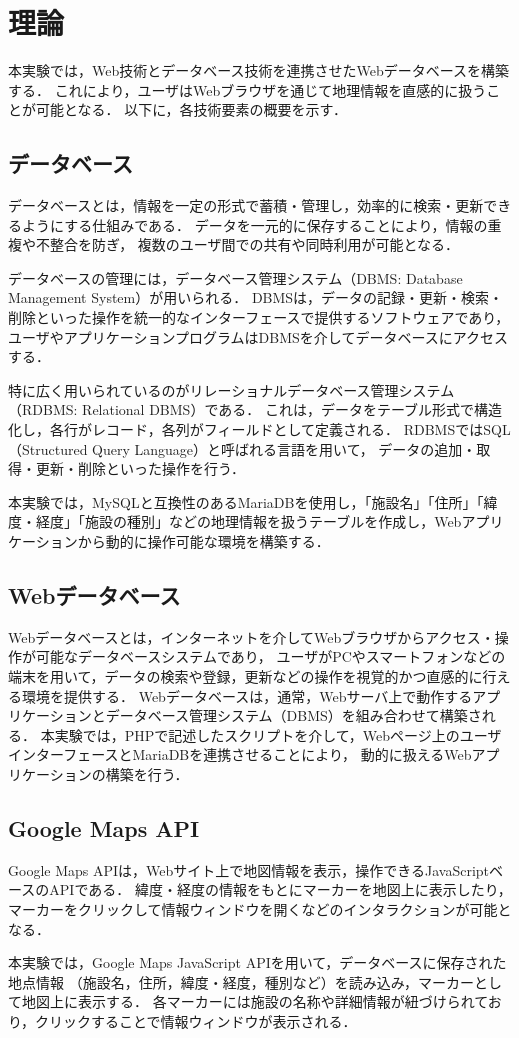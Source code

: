 \section{理論}

本実験では，Web技術とデータベース技術を連携させたWebデータベースを構築する．
これにより，ユーザはWebブラウザを通じて地理情報を直感的に扱うことが可能となる．
以下に，各技術要素の概要を示す．

\subsection{データベース}

データベースとは，情報を一定の形式で蓄積・管理し，効率的に検索・更新できるようにする仕組みである．
データを一元的に保存することにより，情報の重複や不整合を防ぎ，
複数のユーザ間での共有や同時利用が可能となる．

データベースの管理には，データベース管理システム（DBMS: Database Management System）が用いられる．
DBMSは，データの記録・更新・検索・削除といった操作を統一的なインターフェースで提供するソフトウェアであり，
ユーザやアプリケーションプログラムはDBMSを介してデータベースにアクセスする．

特に広く用いられているのがリレーショナルデータベース管理システム（RDBMS: Relational DBMS）である．
これは，データをテーブル形式で構造化し，各行がレコード，各列がフィールドとして定義される．
RDBMSではSQL（Structured Query Language）と呼ばれる言語を用いて，
データの追加・取得・更新・削除といった操作を行う．

本実験では，MySQLと互換性のあるMariaDBを使用し，「施設名」「住所」「緯度・経度」「施設の種別」などの地理情報を扱うテーブルを作成し，Webアプリケーションから動的に操作可能な環境を構築する．

\subsection{Webデータベース}

Webデータベースとは，インターネットを介してWebブラウザからアクセス・操作が可能なデータベースシステムであり，
ユーザがPCやスマートフォンなどの端末を用いて，データの検索や登録，更新などの操作を視覚的かつ直感的に行える環境を提供する．
Webデータベースは，通常，Webサーバ上で動作するアプリケーションとデータベース管理システム（DBMS）を組み合わせて構築される．
本実験では，PHPで記述したスクリプトを介して，Webページ上のユーザインターフェースとMariaDBを連携させることにより，
動的に扱えるWebアプリケーションの構築を行う．

\subsection{Google Maps API}
Google Maps APIは，Webサイト上で地図情報を表示，操作できるJavaScriptベースのAPIである．
緯度・経度の情報をもとにマーカーを地図上に表示したり，
マーカーをクリックして情報ウィンドウを開くなどのインタラクションが可能となる．

本実験では，Google Maps JavaScript APIを用いて，データベースに保存された地点情報
（施設名，住所，緯度・経度，種別など）を読み込み，マーカーとして地図上に表示する．
各マーカーには施設の名称や詳細情報が紐づけられており，クリックすることで情報ウィンドウが表示される．
